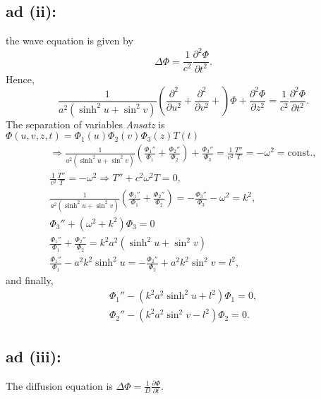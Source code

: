 {\subsection*{ad (ii):}
the wave equation is given by
$$
  \Delta\Phi=\frac{1}{c^2}\frac{\partial^2 \Phi}{\partial t^2}.
$$
Hence,
$$
  \frac{1}{a^2(\sinh^2u+\sin^2v)}
  \left(
    \frac{\partial^2}{\partial u^2}+\frac{\partial^2}{\partial v^2}+
  \right)\Phi+
  \frac{\partial^2 \Phi}{\partial z^2}=
  \frac{1}{c^2}\frac{\partial^2 \Phi}{\partial t^2}.
$$
The separation of variables {\it Ansatz} is  $\Phi (u,v,z,t)=\Phi_1(u)\Phi_2(v)\Phi_3(z)T(t)$
\begin{equation}
\begin{split}
  \Longrightarrow
  \frac{1}{a^2(\sinh^2u+\sin^2v)}
  \left(
    \frac{\Phi_1''}{\Phi_1}+
    \frac{\Phi_2''}{\Phi_2}
  \right)+
  \frac{\Phi_3''}{\Phi_3}=\frac{1}{c^2}\frac{T''}{T}=-\omega^2=\mbox{const.},
\\
  \frac{1}{c^2}\frac{T''}{T}=-\omega^2 \Longrightarrow T''+c^2\omega^2T=0,
\\
  \frac{1}{a^2(\sinh^2u+\sin^2v)}
  \left(
    \frac{\Phi_1''}{\Phi_1}+
    \frac{\Phi_2''}{\Phi_2}
  \right)=
  -\frac{\Phi_3''}{\Phi_3}-\omega^2=k^2,
\\
  \Phi_3''+(\omega^2+k^2)\Phi_3=0
\\
  \frac{\Phi_1''}{\Phi_1}+
  \frac{\Phi_2''}{\Phi_2}=k^2a^2(\sinh^2u+\sin^2v)
\\
  \frac{\Phi_1''}{\Phi_1}-a^2k^2\sinh^2u=
  -\frac{\Phi_2''}{\Phi_2}+a^2k^2\sin^2v=l^2,
\end{split}
\end{equation}
and finally,
\begin{equation}
  \begin{split}
    \Phi_1''   -   (k^2a^2\sinh^2u+l^2)\Phi_1   =   0, \\
    \Phi_2''   -   (k^2a^2\sin^2v-l^2)\Phi_2   =   0.
  \end{split}
\end{equation}


\subsection*{ad (iii):}
The diffusion equation is
$\Delta\Phi=\frac{1}{D}\frac{\partial \Phi}{\partial t}$.

}
